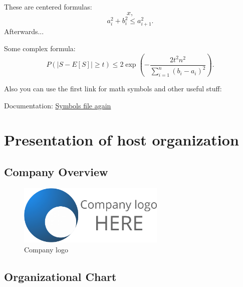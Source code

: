 These are centered formulas: $$x,$$ $$a_i^2 + b_i^2 \le a_{i+1}^2.$$ Afterwards...

Some complex formula: $$P(|S - E[S]| \ge t) \le 2 \exp \left( -\frac{2 t^2 n^2}{\sum_{i = 1}^n (b_i - a_i)^2} \right).$$

Also you can use the first link for math symbols and other useful stuff:

Documentation: \href{https://www.cmor-faculty.rice.edu/~heinken/latex/symbols.pdf}{Symbols file again}



\newpage


\section{Presentation of host organization}



\subsection{Company Overview}

\begin{figure}[H] 
    \centering
    \includegraphics[width=7cm]{Logos/Company_Logo_Expl.png}
    \caption{Company logo}
\end{figure}



\subsection{Organizational Chart}


